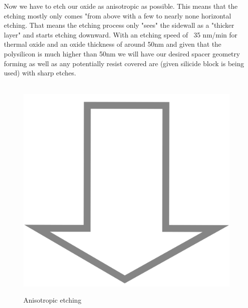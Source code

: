 Now we have to etch our oxide as anisotropic as possible. This means that the etching mostly only comes "from above with a few to nearly none horizontal etching.
That means the etching process only "sees" the sidewall as a "thicker layer" and starts etching downward.
With an etching speed of ~35 nm/min for thermal oxide and an oxide thickness of around 50nm and given that the polysilicon is much higher than 50nm we will have our desired spacer geometry forming as well as any potentially resist covered are (given silicide block is being used) with sharp etches.

\begin{figure}[H]
	\centering
	\begin{tikzpicture}[node distance = 3cm, auto, thick,scale=\CrossSectionOnly, every node/.style={transform shape}]
		
	\end{tikzpicture}\\
	\includegraphics[scale=0.01]{down_arrow.png}\\
	\begin{tikzpicture}[node distance = 3cm, auto, thick,scale=\CrossSectionOnly, every node/.style={transform shape}]
		
	\end{tikzpicture}
	\caption{Anisotropic etching}
\end{figure}

